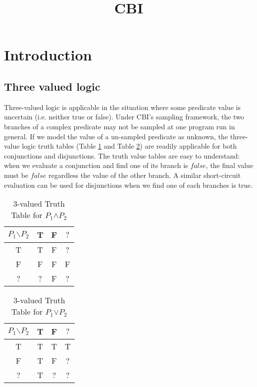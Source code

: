 \documentclass{article}
\begin{document}
\title{CBI }
\maketitle
\begin{abstract}



\end{abstract}


\section{Introduction}

\subsection{Three valued logic}

Three-valued logic is applicable in the situation where some
predicate value is uncertain (i.e. neither true or false). Under
CBI's sampling framework, the two branches of a complex predicate
may not be sampled at one program run in general. If we model the
value of a un-sampled predicate as unknown, the three-value logic
truth tables (Table \ref{and} and Table \ref{or}) are readily
applicable for both conjunctions and disjunctions. The truth value
tables are easy to understand: when we evaluate a conjunction and
find one of its branch is $false$, the final value must be $false$
regardless the value of the other branch. A similar short-circuit
evaluation can be used for disjunctions when we find one of each
branches is true.


\begin{table}[h]
  \centering
  \begin{tabular}{|c|ccc|}
  \hline
  $P_1$$\backslash$$P_2$ & T & F & $?$ \\
  \hline
  T & T & F & ? \\
  F & F & F & F \\
  ? & ? & F & ? \\
  \hline
\end{tabular}
  \caption{3-valued Truth Table for $P_1$$\wedge$$P_2$}\label{and}
\end{table}


\begin{table}[h]
  \centering
  \begin{tabular}{|c|ccc|}
  \hline
  $P_1$$\backslash$$P_2$ & T & F & $?$ \\
  \hline
  T & T & T & T \\
  F & T & F & ? \\
  ? & T & ? & ? \\
  \hline
\end{tabular}
  \caption{3-valued Truth Table for $P_1$$\vee$$P_2$}\label{or}
\end{table}
\end{document}

